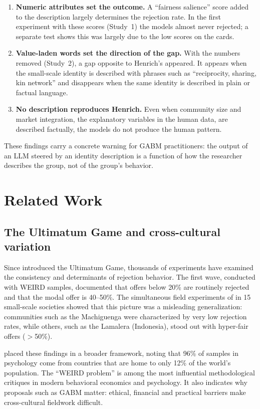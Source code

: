 \documentclass[11pt]{article}
\begin{document}
\begin{enumerate}
\item \textbf{Numeric attributes set the outcome.} A ``fairness salience'' score added to the description largely determines the rejection rate. In the first experiment with these scores (Study~1) the models almost never rejected; a separate test shows this was largely due to the low scores on the cards.
\item \textbf{Value-laden words set the direction of the gap.} With the numbers removed (Study~2), a gap opposite to Henrich's appeared. It appears when the small-scale identity is described with phrases such as ``reciprocity, sharing, kin network'' and disappears when the same identity is described in plain or factual language.
\item \textbf{No description reproduces Henrich.} Even when community size and market integration, the explanatory variables in the human data, are described factually, the models do not produce the human pattern.
\end{enumerate}

These findings carry a concrete warning for GABM practitioners: the output of an LLM steered by an identity description is a function of how the researcher describes the group, not of the group's behavior.


\section{Related Work}

\subsection{The Ultimatum Game and cross-cultural variation}

Since \citet{guth1982} introduced the Ultimatum Game, thousands of experiments have examined the consistency and determinants of rejection behavior. The first wave, conducted with WEIRD samples, documented that offers below 20\% are routinely rejected and that the modal offer is 40--50\%. The simultaneous field experiments of \citet{henrich2001} in 15 small-scale societies showed that this picture was a misleading generalization: communities such as the Machiguenga were characterized by very low rejection rates, while others, such as the Lamalera (Indonesia), stood out with hyper-fair offers ($>$50\%).

\citet{henrich2010} placed these findings in a broader framework, noting that 96\% of samples in psychology come from countries that are home to only 12\% of the world's population. The ``WEIRD problem'' is among the most influential methodological critiques in modern behavioral economics and psychology. It also indicates why proposals such as GABM matter: ethical, financial and practical barriers make cross-cultural fieldwork difficult.
\end{document}
